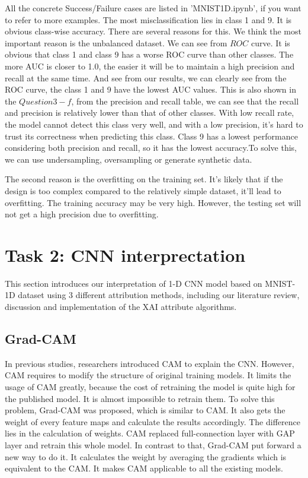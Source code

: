 \documentclass[conference]{IEEEtran}
\begin{document}
	All the concrete Success/Failure cases are listed in 'MNIST1D.ipynb', if you want to refer to more examples.
	The most misclassification lies in class 1 and 9. It is obvious class-wise accuracy.
    There are several reasons for this. We think the most important reason is the unbalanced dataset. 
    We can see from $ROC$ curve. It is obvious that class 1 and class 9 has a worse ROC curve than other classes.
    The more AUC is closer to 1.0, the easier it will be to maintain a high precision and recall at the same time.
    And see from our results, we can clearly see from the ROC curve, the class 1 and 9 have the lowest AUC values.
    This is also shown in the $Question 3-f$, from the precision and recall table, we can see that the recall and precision is relatively lower than that of other classes.
    With low recall rate, the model cannot detect this class very well, and with a low precision, it's hard to trust its correctness when predicting this class.
    Class 9 has a lowest performance considering both precision and recall, so it has the lowest accuracy.To solve this, we can use undersampling, oversampling or generate synthetic data.\par
    The second reason is the overfitting on the training set. It's likely that if the design is too complex compared to the relatively simple dataset, it'll lead to overfitting. The training accuracy may be very high. However, the testing set will not get a high precision due to overfitting.


\section{Task 2: CNN interprectation}

This section introduces our interpretation of 1-D CNN model based on MNIST-1D dataset using 3 different attribution methods, including our literature review, discussion and implementation of the XAI attribute algorithms.

\subsection{Grad-CAM}
In previous studies, researchers introduced CAM to explain the CNN. However, CAM requires to modify the structure of original training models. It limits the usage of CAM greatly, because the cost of retraining the model is quite high for the published model. It is almost impossible to retrain them.
To solve this problem, Grad-CAM was proposed, which is similar to CAM. It also gets the weight of every feature maps and calculate the results accordingly. The difference lies in the calculation of weights. CAM replaced full-connection layer with GAP layer and retrain this whole model. In contrast to that, Grad-CAM put forward a new way to do it.
It calculates the weight by averaging the gradients which is equivalent to the CAM. It makes CAM applicable to all the existing models.\par
\end{document}
